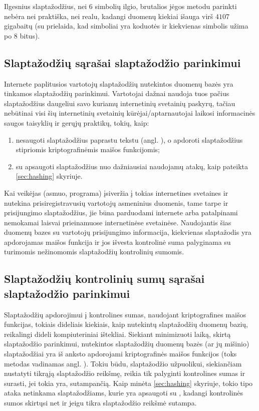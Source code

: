 \documentclass{VUMIFInfBakalaurinis}
\begin{document}
Ilgesnius slaptažodžius, nei 6 simbolių ilgio, brutalios jėgos metodu parinkti 
nebėra nei praktiška, nei realu, kadangi duomenų kiekiai išauga virš $4107$ 
gigabaitų (su prielaida, kad simboliai yra  koduotės ir 
kiekvienas simbolis užima po 8 bitus).

\subsection{Slaptažodžių sąrašai slaptažodžio parinkimui} \label{sec:wordlists}
Internete paplitusios vartotojų slaptažodžių nutekintos duomenų bazės yra 
tinkamos slaptažodžių parinkimui. Vartotojai dažnai naudoja tuos pačius 
slaptažodžius daugeliui savo kuriamų internetinių svetainių paskyrų, tačiau 
nebūtinai visi šių internetinių svetainių kūrėjai/aptarnautojai laikosi
informacinės saugos taisyklių ir gerųjų praktikų, tokių, kaip:
\begin{enumerate}
  \item nesaugoti slaptažodžius paprastu tekstu (angl. ), 
        o apdoroti slaptažodžius stipriomis kriptografinėmis maišos funkcijomis;
  \item su  apsaugoti slaptažodžius nuo dažniausiai naudojamų 
        atakų, kaip pateikta \ref{sec:hashing} skyriuje.
\end{enumerate}

Kai veikėjas (asmuo, programa) įsiveržia į tokias internetines svetaines ir 
nutekina prisiregistravusių vartotojų asmeninius duomenis, tame tarpe ir 
prisijungimo slaptažodžius, jie būna parduodami internete arba patalpinami 
nemokamai laisvai prieinamuose internetinėse svetainėse.
Naudojantis šias duomenų bazes su vartotojų prisijungimo informacija, kiekvienas 
slaptažodis yra apdorojamas maišos funkcija ir jos išvesta kontrolinė suma 
palyginama su turimomis nežinomomis slaptažodžių kontrolinių sumomis.

\subsection{Slaptažodžių kontrolinių sumų sąrašai slaptažodžio parinkimui} 
\label{sec:rainbowtables}
Slaptažodžių apdorojimui į kontrolines sumas, naudojant kriptografines maišos 
funkcijas, tokiais dideliais kiekiais, kaip nutekintų slaptažodžių duomenų 
bazių, reikalingi dideli kompiuteriniai ištekliai. Siekiant minimizuoti laiką, 
skirtą slaptažodžio parinkimui, nutekintos slaptažodžių duomenų bazės (ar jų 
mišinio) slaptažodžiai yra iš anksto apdorojami kriptografinės maišos funkcijos 
(toks metodas vadinamas angl. ). Tokiu būdu, 
slaptažodžio užpuolikui, siekiančiam nustatyti tikrąją slaptažodžio reikšmę, 
reikia tik palyginti kontrolines sumas ir surasti, jei tokia yra, sutampančią. 
Kaip minėta \ref{sec:hashing} skyriuje, tokio tipo ataka netinkama 
slaptažodžiams, kurie yra apsaugoti su , kadangi kontrolinės 
sumos skirtųsi net ir jeigu tikra slaptažodžio reikšmė sutampa.
\end{document}
